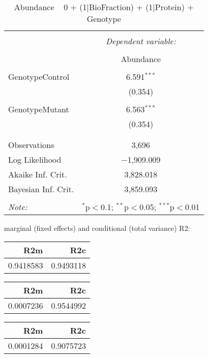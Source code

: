 \documentclass[11pt]{report}
\begin{document}
\begin{table}[!htbp] \centering 
  \caption{Abundance ~ 0 + (1|BioFraction) + (1|Protein) + Genotype} 
  \label{} 
\begin{tabular}{@{\extracolsep{5pt}}lc} 
\\[-1.8ex]\hline 
\hline \\[-1.8ex] 
 & \multicolumn{1}{c}{\textit{Dependent variable:}} \\ 
\cline{2-2} 
\\[-1.8ex] & Abundance \\ 
\hline \\[-1.8ex] 
 GenotypeControl & 6.591$^{***}$ \\ 
  & (0.354) \\ 
  & \\ 
 GenotypeMutant & 6.563$^{***}$ \\ 
  & (0.354) \\ 
  & \\ 
\hline \\[-1.8ex] 
Observations & 3,696 \\ 
Log Likelihood & $-$1,909.009 \\ 
Akaike Inf. Crit. & 3,828.018 \\ 
Bayesian Inf. Crit. & 3,859.093 \\ 
\hline 
\hline \\[-1.8ex] 
\textit{Note:}  & \multicolumn{1}{r}{$^{*}$p$<$0.1; $^{**}$p$<$0.05; $^{***}$p$<$0.01} \\ 
\end{tabular} 
\end{table} 
marginal (fixed effects) and conditional (total variance) R2:

\begin{tabular}{r|r}
\hline
R2m & R2c\\
\hline
0.9418583 & 0.9493118\\
\hline
\end{tabular}

\begin{tabular}{r|r}
\hline
R2m & R2c\\
\hline
0.0007236 & 0.9544992\\
\hline
\end{tabular}

\begin{tabular}{r|r}
\hline
R2m & R2c\\
\hline
0.0001284 & 0.9075723\\
\hline
\end{tabular}
\end{document}

